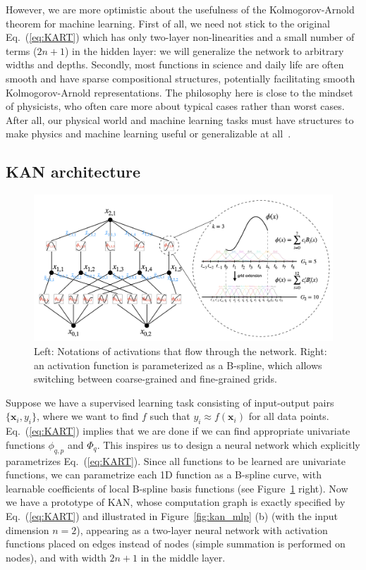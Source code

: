 \documentclass{article}
\numberwithin{equation}{section}
\numberwithin{figure}{section}
\newcommand{\mat}[1]{\mathbf{#1}}
\begin{document}
However, we are more optimistic about the usefulness of the Kolmogorov-Arnold theorem for machine learning. First of all, we need not stick to the original Eq.~(\ref{eq:KART}) which has only two-layer non-linearities and a small number of terms ($2n+1$) in the hidden layer: we will generalize the network to arbitrary widths and depths. Secondly, most functions in science and daily life are often smooth and have sparse  compositional structures, potentially facilitating smooth Kolmogorov-Arnold representations. The philosophy here is close to the mindset of physicists, who often care more about typical cases rather than worst cases. After all, our physical world and machine learning tasks must have structures to make physics and machine learning useful or generalizable at all~\cite{lin2017does}.

\subsection{KAN architecture}\label{subsec:kan_architecture}

\begin{figure}[t]
    \centering
    \includegraphics[width=0.9\linewidth]{figs/spline_notation.png}
    \caption{Left: Notations of activations that flow through the network. Right: an activation function is parameterized as a B-spline, which allows switching between coarse-grained and fine-grained grids.}
    \label{fig:spline-notation}
\end{figure}

Suppose we have a supervised learning task consisting of input-output pairs $\{\mat{x}_i,y_i\}$, where we want to find $f$ such that $y_i\approx f(\mat{x}_i)$ for all data points.
Eq.~(\ref{eq:KART}) implies that we are done if we can find appropriate univariate functions $\phi_{q,p}$ and $\Phi_q$. This inspires us to design a neural network which explicitly parametrizes Eq.~(\ref{eq:KART}). Since all functions to be learned are univariate functions, we can parametrize each 1D function as a B-spline curve, with learnable coefficients of local B-spline basis functions (see Figure~\ref{fig:spline-notation} right). Now we have a prototype of KAN, whose computation graph is exactly specified by Eq.~(\ref{eq:KART}) and  illustrated in Figure~\ref{fig:kan_mlp} (b) (with the input dimension $n=2$), appearing as a two-layer neural network with activation functions placed on edges instead of nodes (simple summation is performed on nodes), and with width $2n+1$ in the middle layer.
\end{document}
